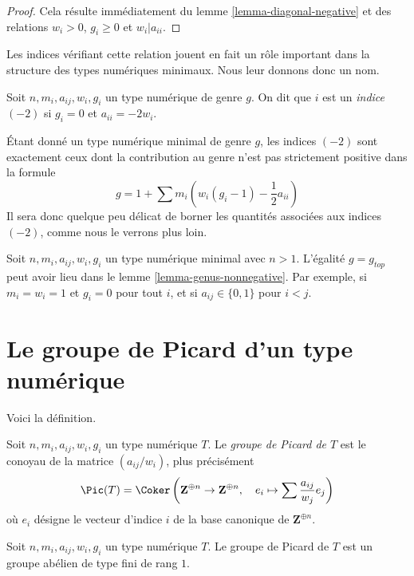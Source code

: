 \begin{proof}
Cela résulte immédiatement du lemme \ref{lemma-diagonal-negative} et des relations
$w_i > 0$, $g_i \geq 0$ et $w_i | a_{ii}$.
\end{proof}

\noindent
Les indices vérifiant cette relation jouent en fait un
rôle important dans la structure des types numériques minimaux.
Nous leur donnons donc un nom.

\begin{definition}
\label{definition-type-minus-two}
Soit $n, m_i, a_{ij}, w_i, g_i$ un type numérique de genre $g$.
On dit que $i$ est un {\it indice $(-2)$} si $g_i = 0$ et $a_{ii} = -2w_i$.
\end{definition}

\noindent
Étant donné un type numérique minimal de genre $g$, les indices $(-2)$
sont exactement ceux dont la contribution au genre n'est pas strictement positive
dans la formule
$$
g = 1 + \sum m_i(w_i(g_i - 1) - \frac{1}{2} a_{ii})
$$
Il sera donc quelque peu délicat de borner les quantités associées
aux indices $(-2)$, comme nous le verrons plus loin.

\begin{remark}
\label{remark-genus-equality}
Soit $n, m_i, a_{ij}, w_i, g_i$ un type numérique minimal avec $n > 1$.
L'égalité $g = g_{top}$ peut avoir lieu dans le lemme \ref{lemma-genus-nonnegative}.
Par exemple, si $m_i = w_i = 1$ et $g_i = 0$ pour tout $i$, et si
$a_{ij} \in \{0, 1\}$ pour $i < j$.
\end{remark}


\section{Le groupe de Picard d'un type numérique}
\label{section-picard-group}

\noindent
Voici la définition.

\begin{definition}
\label{definition-picard-group}
Soit $n, m_i, a_{ij}, w_i, g_i$ un type numérique $T$. Le
{\it groupe de Picard de $T$} est le conoyau de la matrice
$(a_{ij}/w_i)$, plus précisément
$$
\Pic(T) =
\Coker\left(
\mathbf{Z}^{\oplus n} \to \mathbf{Z}^{\oplus n},\quad
e_i
\mapsto
\sum \frac{a_{ij}}{w_j}e_j
\right)
$$
où $e_i$ désigne le vecteur d'indice $i$ de la base canonique de $\mathbf{Z}^{\oplus n}$.
\end{definition}

\begin{lemma}
\label{lemma-picard-rank-1}
Soit $n, m_i, a_{ij}, w_i, g_i$ un type numérique $T$.
Le groupe de Picard de $T$ est un groupe abélien de type fini de rang $1$.
\end{lemma}

